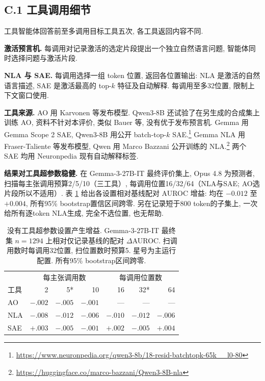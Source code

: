 \subsection*{C.1 工具调用细节}
工具智能体回答前至多调用目标工具五次, 各工具返回内容不同.

\textbf{激活预言机.} 每调用对记录激活的选定片段提出一个独立自然语言问题, 智能体同时选择问题与激活片段.

\textbf{NLA 与 SAE.} 每调用选择一组 token 位置, 返回各位置输出: NLA 是激活的自然语言描述, SAE 是激活最高的 top-$k$ 特征及自动解释. 每调用至多32位置, 限制上下文窗口使用.

\textbf{工具来源.} AO 用 Karvonen 等发布模型\cite{chive-karvonen2026activationoraclestrainingevaluating}. Qwen3-8B 还试验了在另生成的合成集上训练 AO, 资料不针对本评价, 类似 Bauer 等\cite{chive-bauer2026buildingbetteractivationoracles}, 没有优于发布预言机. Gemma 用 Gemma Scope 2 SAE\cite{chive-mcdougall2025gemmascope2}, Qwen3-8B 用公开 batch-top-$k$ SAE.\footnote{\url{https://www.neuronpedia.org/qwen3-8b/18-resid-batchtopk-65k__l0-80}} Gemma NLA 用 Fraser-Taliente 等发布模型\cite{chive-frasertaliente2026nla}, Qwen 用 Marco Bazzani 公开训练的 NLA.\footnote{\url{https://huggingface.co/marco-bazzani/Qwen3-8B-nla}} 两个 SAE 均用 Neuronpedia 现有自动解释标签\cite{chive-neuronpedia}.

\textbf{结果对工具超参数稳健.} 在 Gemma-3-27B-IT 最终评价集上, Opus 4.8 为预测者, 扫描每主张调用预算2/5/10（三工具）, 每调用位置16/32/64（NLA与SAE; AO选片段所以不适用）. 表 \ref{chive-tab:toolsweep} 给出各设置相对基线配对 AUROC 增益: 均在 $-0.012$ 至 $+0.004$, 所有95\% bootstrap置信区间跨零. 另在记录短于800 token的子集上, 一次给所有逐token NLA生成, 完全不选位置, 也无帮助.

\begin{table}[ht]\centering
\begin{tabular}{lrrrrrr}\toprule
 & \multicolumn{3}{c}{每主张调用数} & \multicolumn{3}{c}{每调用位置数}\\
工具 & 2 & 5* & 10 & 16 & 32* & 64\\\midrule
AO & $-.002$ & $-.005$ & $-.001$ & --- & --- & ---\\
NLA & $-.008$ & $-.012$ & $-.006$ & $-.010$ & $-.012$ & $-.006$\\
SAE & $+.003$ & $-.005$ & $-.001$ & $+.002$ & $-.005$ & $+.004$\\\bottomrule
\end{tabular}
\caption{没有工具超参数设置产生增益. Gemma-3-27B-IT 最终集 $n=1294$ 上相对仅记录基线的配对 $\Delta$AUROC. 扫调用数时每调用32位置, 扫位置数时预算5. 星号为主运行配置. 所有95\% bootstrap区间跨零.}\label{chive-tab:toolsweep}
\end{table}

